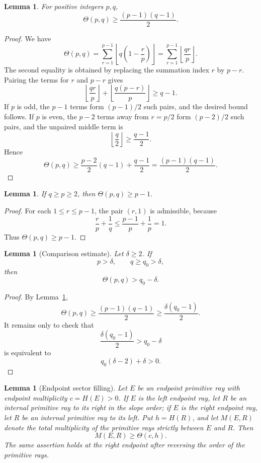 \documentclass[11pt]{article}
\newtheorem{lemma}[theorem]{Lemma}
\begin{document}
\begin{lemma}\label{lem:theta-bound}
For positive integers $p,q$,
\[
        \Theta(p,q)\ge \frac{(p-1)(q-1)}2.
\]
\end{lemma}

\begin{proof}
We have
\[
\Theta(p,q)
=
\sum_{r=1}^{p-1}
\left\lfloor q\left(1-\frac rp\right)\right\rfloor
=
\sum_{r=1}^{p-1}
\left\lfloor \frac{qr}{p}\right\rfloor.
\]
The second equality is obtained by replacing the summation index $r$ by $p-r$.  Pairing the terms for $r$ and $p-r$ gives
\[
\left\lfloor\frac{qr}{p}\right\rfloor+
\left\lfloor\frac{q(p-r)}{p}\right\rfloor
\ge q-1.
\]
If $p$ is odd, the $p-1$ terms form $(p-1)/2$ such pairs, and the desired bound follows.  If $p$ is even, the $p-2$ terms away from $r=p/2$ form $(p-2)/2$ such pairs, and the unpaired middle term is
\[
        \left\lfloor\frac q2\right\rfloor\ge\frac{q-1}{2}.
\]
Hence
\[
        \Theta(p,q)
        \ge
        \frac{p-2}{2}(q-1)+\frac{q-1}{2}
        =
        \frac{(p-1)(q-1)}2.
\]
\end{proof}

\begin{lemma}\label{lem:theta-linear}
If $q\ge p\ge2$, then $\Theta(p,q)\ge p-1$.
\end{lemma}

\begin{proof}
For each $1\le r\le p-1$, the pair $(r,1)$ is admissible, because
\[
        \frac rp+\frac1q
        \le
        \frac{p-1}{p}+\frac1p
        =1.
\]
Thus $\Theta(p,q)\ge p-1$.
\end{proof}

\begin{lemma}[Comparison estimate]\label{lem:absorption}
Let $\delta\ge2$.  If
\[
        p>\delta,
        \qquad
        q\ge q_0>\delta,
\]
then
\[
        \Theta(p,q)>q_0-\delta.
\]
\end{lemma}

\begin{proof}
By Lemma~\ref{lem:theta-bound},
\[
        \Theta(p,q)\ge\frac{(p-1)(q-1)}2
        \ge
        \frac{\delta(q_0-1)}2.
\]
It remains only to check that
\[
        \frac{\delta(q_0-1)}2>q_0-\delta
\]
is equivalent to
\[
        q_0(\delta-2)+\delta>0.
\]
\end{proof}



\begin{lemma}[Endpoint sector filling]\label{lem:endpoint-sector}
Let $E$ be an endpoint primitive ray with endpoint multiplicity $c=H(E)>0$.  If $E$ is the left endpoint ray, let $R$ be an internal primitive ray to its right in the slope order; if $E$ is the right endpoint ray, let $R$ be an internal primitive ray to its left.  Put $h=H(R)$, and let $M(E,R)$ denote the total multiplicity of the primitive rays strictly between $E$ and $R$.  Then
\[
        M(E,R)\ge \Theta(c,h).
\]
The same assertion holds at the right endpoint after reversing the order of the primitive rays.
\end{lemma}
\end{document}
